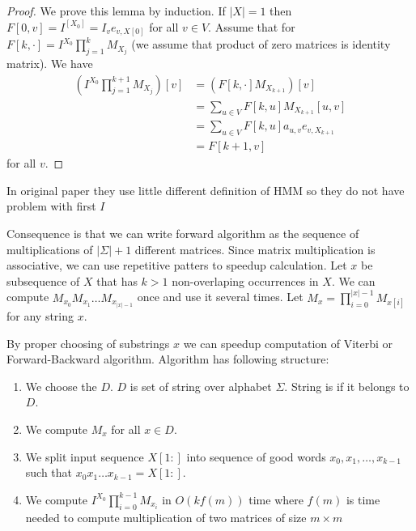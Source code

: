 \begin{proof}
We prove this lemma by induction.  If $|X|=1$ then
$F[0,v]=I^[X_0]=I_{v}e_{v,X[0]}$ for all $v\in V$.  Assume that for
$F[k,\cdot] = I^{X_0}\prod_{j=1}^k M_{X_j}$ (we assume that product of zero matrices
is identity matrix). We have 
\begin{align*}
\left(I^{X_0}\prod_{j=1}^{k+1} M_{X_j}\right)[v] &= 
\left(F[k,\cdot] M_{X_{k+1}}\right)[v]\\ &= \sum_{u\in V} F[k,u]
M_{X_{k+1}}[u,v]\\ &= \sum_{u\in V} F[k,u] a_{u,v}e_{v,X_{k+1} } \\&= F[k+1,v] 
\end{align*}
for all $v$. 
\end{proof}

\begin{note}
In original paper \cite{Lifshits2009} they use little different definition of
HMM so they do not have problem with first $I$

\end{note}

Consequence is that we can write forward algorithm as the sequence of
multiplications of $|\Sigma|+1$ different matrices. Since matrix multiplication
is associative, we can use repetitive patters to speedup calculation. 
Let $x$ be subsequence of $X$ that has $k>1$ non-overlaping occurrences in $X$.
We can compute $M_{x_0}M_{x_1}\dots M_{x_{|x|-1}}$ once and use it several
times. Let $M_{x}=\prod_{i=0}^{|x|-1}M_{x[i]}$ for any string $x$.

By proper choosing of substrings $x$ we can speedup computation of Viterbi or
Forward-Backward algorithm. Algorithm has following structure:
\begin{enumerate}
\item We choose the  $D$. $D$ is set of string over alphabet $\Sigma$. String is
 if it belongs to $D$.
\item We compute $M_x$ for all $x\in D$.
\item We split input sequence $X[1:]$ into sequence of good words
$x_0,x_1,\dots,x_{k-1}$ such that $x_0x_1\dots x_{k-1}=X[1:]$.
\item We compute $I^{X_0}\prod_{i=0}^{k-1}M_{x_i}$ in $O(kf(m))$ time where
$f(m)$ is time needed to compute multiplication of two matrices of size $m\times m$
\end{enumerate}

